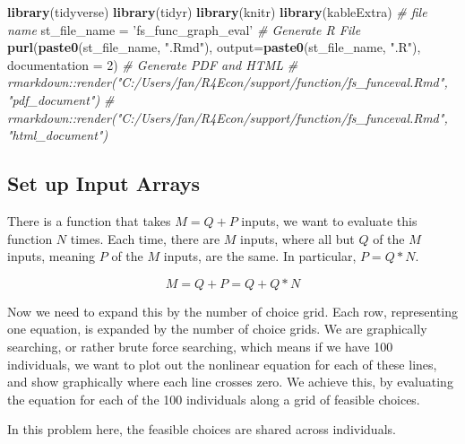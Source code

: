 \documentclass[]{article}
\newenvironment{Shaded}{\begin{snugshade}}{\end{snugshade}}
\newcommand{\CommentTok}[1]{\textcolor[rgb]{0.56,0.35,0.01}{\textit{#1}}}
\newcommand{\DataTypeTok}[1]{\textcolor[rgb]{0.13,0.29,0.53}{#1}}
\newcommand{\DecValTok}[1]{\textcolor[rgb]{0.00,0.00,0.81}{#1}}
\newcommand{\KeywordTok}[1]{\textcolor[rgb]{0.13,0.29,0.53}{\textbf{#1}}}
\newcommand{\NormalTok}[1]{#1}
\newcommand{\StringTok}[1]{\textcolor[rgb]{0.31,0.60,0.02}{#1}}
\begin{document}
\begin{Shaded}
\begin{Highlighting}[]
\KeywordTok{library}\NormalTok{(tidyverse)}
\KeywordTok{library}\NormalTok{(tidyr)}
\KeywordTok{library}\NormalTok{(knitr)}
\KeywordTok{library}\NormalTok{(kableExtra)}
\CommentTok{# file name}
\NormalTok{st_file_name =}\StringTok{ 'fs_func_graph_eval'}
\CommentTok{# Generate R File}
\KeywordTok{purl}\NormalTok{(}\KeywordTok{paste0}\NormalTok{(st_file_name, }\StringTok{".Rmd"}\NormalTok{), }\DataTypeTok{output=}\KeywordTok{paste0}\NormalTok{(st_file_name, }\StringTok{".R"}\NormalTok{), }\DataTypeTok{documentation =} \DecValTok{2}\NormalTok{)}
\CommentTok{# Generate PDF and HTML}
\CommentTok{# rmarkdown::render("C:/Users/fan/R4Econ/support/function/fs_funceval.Rmd", "pdf_document")}
\CommentTok{# rmarkdown::render("C:/Users/fan/R4Econ/support/function/fs_funceval.Rmd", "html_document")}
\end{Highlighting}
\end{Shaded}

\hypertarget{set-up-input-arrays}{%
\subsection{Set up Input Arrays}\label{set-up-input-arrays}}

There is a function that takes \(M=Q+P\) inputs, we want to evaluate
this function \(N\) times. Each time, there are \(M\) inputs, where all
but \(Q\) of the \(M\) inputs, meaning \(P\) of the \(M\) inputs, are
the same. In particular, \(P=Q*N\).

\[M = Q+P = Q + Q*N\]

Now we need to expand this by the number of choice grid. Each row,
representing one equation, is expanded by the number of choice grids. We
are graphically searching, or rather brute force searching, which means
if we have 100 individuals, we want to plot out the nonlinear equation
for each of these lines, and show graphically where each line crosses
zero. We achieve this, by evaluating the equation for each of the 100
individuals along a grid of feasible choices.

In this problem here, the feasible choices are shared across
individuals.
\end{document}
